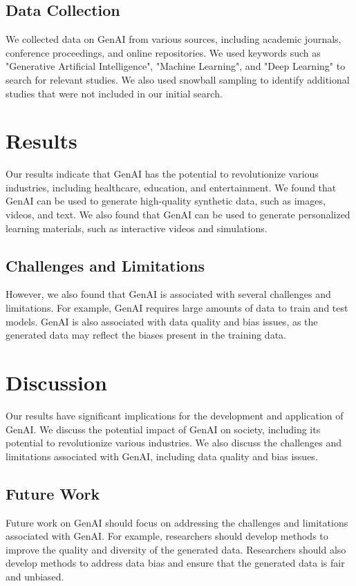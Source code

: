 \documentclass[12pt,a4paper]{article}
\begin{document}
\subsection{Data Collection}
We collected data on GenAI from various sources, including academic journals, conference proceedings, and online repositories. We used keywords such as "Generative Artificial Intelligence", "Machine Learning", and "Deep Learning" to search for relevant studies. We also used snowball sampling to identify additional studies that were not included in our initial search.

\section{Results}
Our results indicate that GenAI has the potential to revolutionize various industries, including healthcare, education, and entertainment. We found that GenAI can be used to generate high-quality synthetic data, such as images, videos, and text. We also found that GenAI can be used to generate personalized learning materials, such as interactive videos and simulations.

\subsection{Challenges and Limitations}
However, we also found that GenAI is associated with several challenges and limitations. For example, GenAI requires large amounts of data to train and test models. GenAI is also associated with data quality and bias issues, as the generated data may reflect the biases present in the training data.

\section{Discussion}
Our results have significant implications for the development and application of GenAI. We discuss the potential impact of GenAI on society, including its potential to revolutionize various industries. We also discuss the challenges and limitations associated with GenAI, including data quality and bias issues.

\subsection{Future Work}
Future work on GenAI should focus on addressing the challenges and limitations associated with GenAI. For example, researchers should develop methods to improve the quality and diversity of the generated data. Researchers should also develop methods to address data bias and ensure that the generated data is fair and unbiased.
\end{document}
